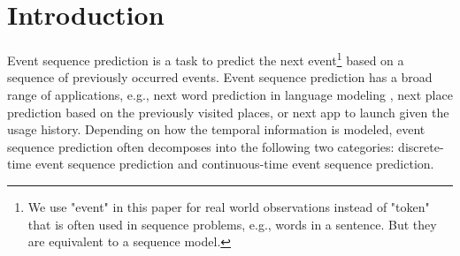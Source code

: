 \documentclass{article} %
\begin{document}






\section{Introduction}

Event sequence prediction is a task to predict the next event\footnote{We use "event" in this paper for real world observations instead of "token" that is often used in sequence problems, e.g., words in a sentence. But they are equivalent to a sequence model.} based on a sequence of previously occurred events. Event sequence prediction has a broad range of applications, e.g., next word prediction in language modeling \citep{DBLP:journals/corr/JozefowiczVSSW16}, next place prediction based on the previously visited places, or next app to launch given the usage history. Depending on how the temporal information is modeled, event sequence prediction often decomposes into the following two categories: discrete-time event sequence prediction and continuous-time event sequence prediction. 
\end{document}
